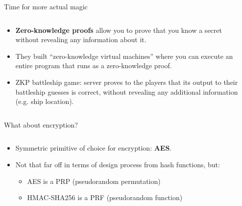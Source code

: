 \documentclass[aspectratio=169, lualatex, handout]{beamer}
\begin{document}
\begin{frame}{Time for more actual magic}
	\begin{columns}[c]
		\begin{column}{0.6\textwidth}
			\begin{itemize}[<+->]
				\item \textbf{Zero-knowledge proofs} allow you to prove that you know
				      a secret without revealing any information about it.
				\item They built ``zero-knowledge virtual machines'' where you can execute
				      an entire program that runs as a zero-knowledge proof.
				\item ZKP battleship game: server proves to the players that its
				      output to their battleship guesses is correct, without revealing any
				      additional information (e.g. ship location).
			\end{itemize}
		\end{column}
		\begin{column}{0.4\textwidth}
		\end{column}
	\end{columns}
\end{frame}

\begin{frame}{What about encryption?}
	\begin{columns}[c]
		\begin{column}{0.6\textwidth}
			\begin{itemize}[<+->]
				\item Symmetric primitive of choice for encryption: \textbf{AES}.
				\item Not that far off in terms of design process from hash functions,
				      but:
				      \begin{itemize}[<+->]
					      \item AES is a PRP (pseudorandom permutation)
					      \item HMAC-SHA256 is a PRF (pseudorandom function)
				      \end{itemize}
			\end{itemize}
		\end{column}

		\begin{column}{0.4\textwidth}
		\end{column}
	\end{columns}
\end{frame}
\end{document}
